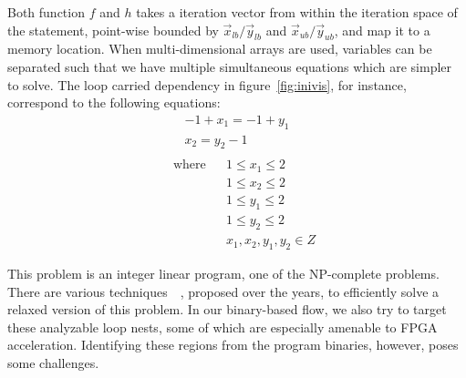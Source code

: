 Both function $f$ and $h$ takes a iteration vector from within the iteration space of the statement, point-wise bounded by $\vec{x}_{lb}/\vec{y}_{lb}$ and $\vec{x}_{ub}/\vec{y}_{ub}$, and map it to a memory location. When
multi-dimensional arrays are used, variables can be separated such that
we have multiple simultaneous equations which are simpler to solve.
The loop carried dependency in figure~\ref{fig:inivis}, for instance, correspond to the following equations:
\begin{equation*}
\begin{aligned}
-1+x_1 = -1+y_1 \\
x_2 = y_2-1 \\ 
\end{aligned}
\end{equation*}
\begin{equation*}
\begin{aligned}
& \text{ where}  & & 1 \le x_1 \le 2 \\
& & & 1 \le x_2 \le 2 \\
& & & 1 \le y_1 \le 2 \\
& & & 1 \le y_2 \le 2 \\
& & & x_1,x_2,y_1,y_2 \in Z
\end{aligned}
\end{equation*}


This problem is an integer linear program, one of the NP-complete problems.  
There are various techniques~\cite{Ban76}~\cite{Banerjee:1988:DAS:535430}, proposed over the years, to efficiently solve a relaxed version of this problem. 
In our binary-based flow, we also try to target these analyzable loop nests, some of which are especially amenable to FPGA acceleration. 
Identifying these regions from the program binaries, however, poses some challenges. 





